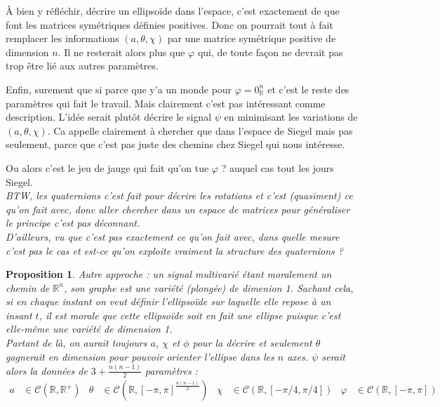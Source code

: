 \documentclass[hidelinks, french, oneside]{article}
\newcommand{\R}{\mathbb{R}}
\theoremstyle{enonce}
\newtheorem{proposition}{Proposition}
\theoremstyle{special}
\theoremstyle{rqlike}
\theoremstyle{exo}
\theoremstyle{demo}
\begin{document}
\`A bien y réfléchir, décrire un ellipsoïde dans l'espace, c'est exactement de que font les matrices symétriques définies positives. Donc on pourrait tout à fait remplacer les informations $(a,\theta,\chi)$ par une matrice symétrique positive de dimension $n$. Il ne resterait alors plus que $\varphi$ qui, de toute façon ne devrait pas trop être lié aux autres paramètres.

Enfin, surement que si parce que y'a un monde pour $\varphi=0_\R^n$ et c'est le reste des paramètres qui fait le travail. Mais clairement c'est pas intéressant comme description. L'idée serait plutôt décrire le signal $\psi$ en minimisant les variations de $(a,\theta,\chi)$.
Ca appelle clairement à chercher que dans l'espace de Siegel mais pas seulement, parce que c'est pas juste des chemins chez Siegel qui nous intéresse.

Ou alors c'est le jeu de jauge qui fait qu'on tue $\varphi$ ? auquel cas tout les jours Siegel.
\\

\textit{BTW, les quaternions c'est fait pour décrire les rotations et c'est (quasiment) ce qu'on fait avec, donc aller chercher dans un espace de matrices pour généraliser le principe c'est pas déconnant.}
\\
\textit{D'ailleurs, vu que c'est pas exactement ce qu'on fait avec, dans quelle mesure c'est pas le cas et est-ce qu'on exploite vraiment la structure des quaternions ?}
\\ 

\begin{proposition}\label{prop:gene_param_signal_v2}
Autre approche : un signal multivarié étant moralement un chemin de $\R^n$, son graphe est une variété (plongée) de dimenion 1. Sachant cela, si en chaque instant on veut définir l'ellipsoïde sur laquelle elle repose à un insant $t$, il est morale que cette ellipsoïde soit en fait une ellipse puisque c'est elle-même une variété de dimension 1.
\\
Partant de là, on aurait toujours $a$, $\chi$ et $\phi$ pour la décrire et seulement $\theta$ gagnerait en dimension pour pouvoir orienter l'ellipse dans les $n$ axes. $\psi$ serait alors la données de $3+\frac{n(n-1)}{2}$ paramètres :
\begin{align*}
	a&\in\mathcal{C}(\R,\R^+)  &  \theta&\in\mathcal{C}(\R, [-\pi,\pi]^{\frac{n(n-1)}{2}})  &  \chi&\in\mathcal{C}(\R, [-\pi/4,\pi/4])  &  \varphi&\in\mathcal{C}(\R, [-\pi,\pi])
\end{align*}
\end{proposition}
\end{document}
